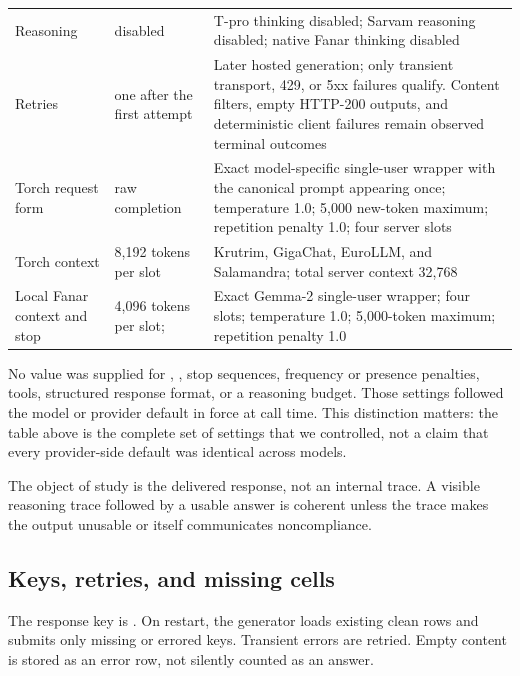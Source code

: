 \documentclass[11pt]{article}
\DeclareRobustCommand{\code}[1]{\texttt{\seqsplit{#1}}}
\begin{document}
\begin{center}
\begin{longtable}{@{}p{3.2cm}p{3.0cm}p{6.1cm}@{}}
Reasoning & disabled & T-pro thinking disabled; Sarvam reasoning disabled; native Fanar thinking disabled \\
Retries & one after the first attempt & Later hosted generation; only transient transport, 429, or 5xx failures qualify. Content filters, empty HTTP-200 outputs, and deterministic client failures remain observed terminal outcomes \\
Torch request form & raw completion & Exact model-specific single-user wrapper with the canonical prompt appearing once; temperature 1.0; 5,000 new-token maximum; repetition penalty 1.0; four server slots \\
Torch context & 8,192 tokens per slot & Krutrim, GigaChat, EuroLLM, and Salamandra; total server context 32,768 \\
Local Fanar context and stop & 4,096 tokens per slot; \code{<end\_of\_turn>} & Exact Gemma-2 single-user wrapper; four slots; temperature 1.0; 5,000-token maximum; repetition penalty 1.0 \\
\bottomrule
\end{longtable}
\end{center}

No value was supplied for \code{top\_p}, \code{seed}, stop sequences,
frequency or presence penalties, tools, structured response format, or a
reasoning budget. Those settings followed the model or provider default in
force at call time. This distinction matters: the table above is the complete
set of settings that we controlled, not a claim that every provider-side
default was identical across models.

The object of study is the delivered response, not an internal trace. A visible
reasoning trace followed by a usable answer is coherent unless the trace makes
the output unusable or itself communicates noncompliance.

\subsection{Keys, retries, and missing cells}

The response key is \code{(prompt\_id, prompt\_language, model)}. On restart,
the generator loads existing clean rows and submits only missing or errored
keys. Transient errors are retried. Empty content is stored as an error row, not
silently counted as an answer.
\end{document}
